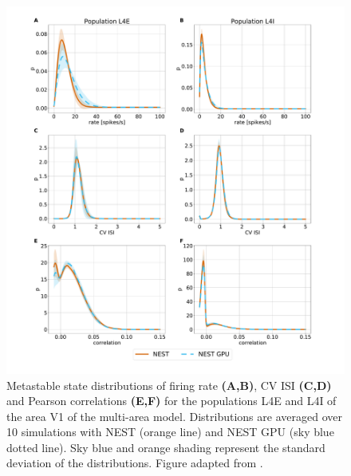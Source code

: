 \documentclass[a4paper, 12pt, twoside, openright]{book}
\begin{document}
\begin{figure}[H]
    \centering
    \includegraphics[trim=3cm 0 3cm 0, clip,width=\columnwidth]{figures/sample_ms.pdf}
    \caption{Metastable state distributions of firing rate 
    \textbf{(A,B)}, CV ISI \textbf{(C,D)} and Pearson correlations \textbf{(E,F)} for the populations L4E and L4I of the area V1 of the multi-area model. Distributions are averaged over 10 simulations with NEST (orange line) and NEST GPU (sky blue dotted line). Sky blue and orange shading represent the standard deviation of the distributions. Figure adapted from \cite{Tiddia2022}.}
    \label{fig:sample_mam_ms}
\end{figure}
\end{document}
